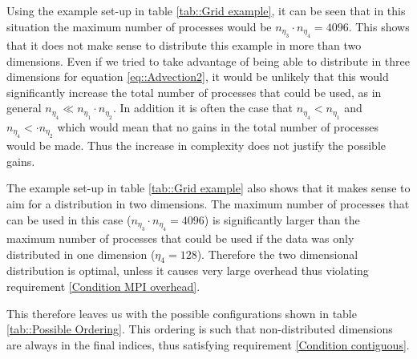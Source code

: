 Using the example set-up in table \ref{tab::Grid example}, it can be seen that in this situation the maximum number of processes would be $n_{\eta_3}\!\!\cdot n_{\eta_4} = 4096$. This shows that it does not make sense to distribute this example in more than two dimensions. Even if we tried to take advantage of being able to distribute in three dimensions for equation \ref{eq::Advection2}, it would be unlikely that this would significantly increase the total number of processes that could be used, as in general $n_{\eta_4}\ll n_{\eta_1}\cdot n_{\eta_2}$. In addition it is often the case that $n_{\eta_4}< n_{\eta_1}$ and $n_{\eta_4}<\cdot n_{\eta_2}$ which would mean that no gains in the total number of processes would be made. Thus the increase in complexity does not justify the possible gains. 

The example set-up in table \ref{tab::Grid example} also shows that it makes sense to aim for a distribution in two dimensions. The maximum number of processes that can be used in this case ($n_{\eta_3}\!\!\cdot n_{\eta_4} = 4096$) is significantly larger than the maximum number of processes that could be used if the data was only distributed in one dimension ($\eta_4=128$). Therefore the two dimensional distribution is optimal, unless it causes very large overhead thus violating requirement \ref{Condition MPI overhead}.

This therefore leaves us with the possible configurations shown in table \ref{tab::Possible Ordering}. This ordering is such that non-distributed dimensions are always in the final indices, thus satisfying requirement \ref{Condition contiguous}.

